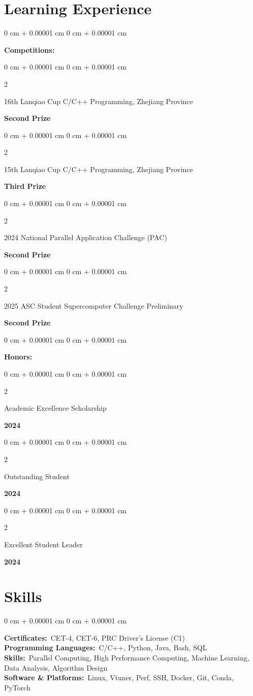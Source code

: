 \documentclass[10pt, letterpaper]{article}
\newenvironment{onecolentry}{
    \begin{adjustwidth}{
        0 cm + 0.00001 cm
    }{
        0 cm + 0.00001 cm
    }
}{
    \end{adjustwidth}
} %
\newenvironment{twocolentry}[2][]{
    \onecolentry
    \def\secondColumn{#2}
    \setcolumnwidth{\fill, 4.5 cm}
    \begin{paracol}{2}
}{
    \switchcolumn \raggedleft \secondColumn
    \end{paracol}
    \endonecolentry
} %
\begin{document}
    \section{Learning Experience}
    \begin{onecolentry}
        \textbf{Competitions:}
    \end{onecolentry}
    \begin{twocolentry}{\textbf{Second Prize}}
        16th Lanqiao Cup C/C++ Programming, Zhejiang Province
    \end{twocolentry}
    \vspace{0.05 cm}
    \begin{twocolentry}{\textbf{Third Prize}}
        15th Lanqiao Cup C/C++ Programming, Zhejiang Province
    \end{twocolentry}
    \vspace{0.05 cm}
    \begin{twocolentry}{\textbf{Second Prize}}
        2024 National Parallel Application Challenge (PAC)
    \end{twocolentry}
    \vspace{0.05 cm}
    \begin{twocolentry}{\textbf{Second Prize}}
        2025 ASC Student Supercomputer Challenge Preliminary
    \end{twocolentry}
    \vspace{0.05 cm}
    \begin{onecolentry}
        \textbf{Honors:}
    \end{onecolentry}
    \vspace{0.05 cm}
    \begin{twocolentry}{\textbf{2024}}
        Academic Excellence Scholarship
    \end{twocolentry}
    \vspace{0.05 cm}
    \begin{twocolentry}{\textbf{2024}}
        Outstanding Student
    \end{twocolentry}
    \vspace{0.05 cm}
    \begin{twocolentry}{\textbf{2024}}
        Excellent Student Leader
    \end{twocolentry}

    \section{Skills}
    \begin{onecolentry}
        \textbf{Certificates:}~CET-4, CET-6, PRC Driver's License (C1) \\
        \vspace{0.08cm}
        \textbf{Programming Languages:}~C/C++, Python, Java, Bash, SQL \\
        \vspace{0.08cm}
        \textbf{Skills:}~Parallel Computing, High Performance Computing, Machine Learning, Data Analysis, Algorithm Design \\
        \vspace{0.08cm}
        \textbf{Software \& Platforms:}~Linux, Vtuner, Perf, SSH, Docker, Git, Conda, PyTorch
    \end{onecolentry}
\end{document}
